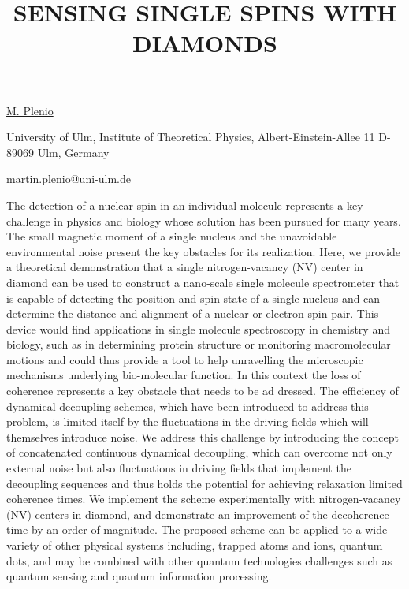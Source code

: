 \title{SENSING SINGLE SPINS WITH DIAMONDS}

\underline{M. Plenio}

{\normalsize{\vspace{-4mm}
University of Ulm,
Institute of Theoretical Physics,
Albert-Einstein-Allee 11
D-89069 Ulm, Germany

\email martin.plenio@uni-ulm.de}}

The detection of a nuclear spin in an individual molecule represents a key challenge in physics and biology whose solution has been pursued for many years. The small magnetic moment of a single nucleus and the unavoidable environmental noise present the key obstacles for its realization. Here, we provide a theoretical demonstration that a single nitrogen-vacancy (NV) center in diamond can be used to construct a nano-scale single molecule spectrometer that is capable of detecting the position and spin state of a single nucleus and can determine the distance and alignment of a nuclear or electron spin pair. This device would find applications in single molecule spectroscopy in chemistry and biology, such as in determining protein structure or monitoring macromolecular motions and could thus provide a tool to help unravelling the microscopic mechanisms underlying bio-molecular function. In this context the loss of coherence represents a key obstacle that needs to be ad
dressed. The efficiency of dynamical decoupling schemes, which have been introduced to address this problem, is limited itself by the fluctuations in the driving fields which will themselves introduce noise. We address this challenge by introducing the concept of concatenated continuous dynamical decoupling, which can overcome not only external noise but also fluctuations in driving fields that implement the decoupling sequences and thus holds the potential for achieving relaxation limited coherence times. We implement the scheme experimentally with nitrogen-vacancy (NV) centers in diamond, and demonstrate an improvement of the decoherence time by an order of magnitude. The proposed scheme can be applied to a wide variety of other physical systems including, trapped atoms and ions, quantum dots, and may be combined with other quantum technologies challenges such as quantum sensing and quantum information processing.

\vspace{\baselineskip} 